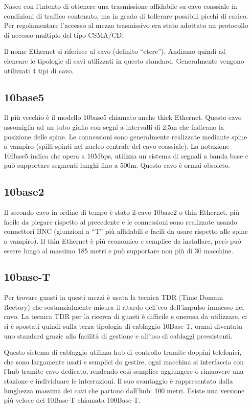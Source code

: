Nasce con l'intento di ottenere una trasmissione affidabile su cavo coassiale in condizioni di traffico contenuto, ma in grado di tollerare possibili picchi di carico. Per regolamentare l'accesso al mezzo trasmissivo era stato adottato un protocollo di accesso multiplo del tipo CSMA/CD.

Il nome Ethernet si riferisce al cavo (definito “etere”). Andiamo quindi ad elencare le tipologie di cavi utilizzati in questo standard.
Generalmente vengono utilizzati 4 tipi di cavo.
\subsection{10base5}
Il più vecchio è il modello 10base5 chiamato anche thick Ethernet. Questo cavo assomiglia ad un tubo giallo con segni a intervalli di 2,5m che indicano la posizione delle spine.
Le connessioni sono generalmente realizzate mediante spine a vampiro (spilli spinti nel nucleo centrale del cavo coassiale). 
La notazione 10Base5 indica che opera a 10Mbps, utilizza un sistema di segnali a banda base e può supportare segmenti lunghi fino a 500m. Questo cavo è ormai obsoleto.
\subsection{10base2}
Il secondo cavo in ordine di tempo è stato il cavo 10base2 o thin Ethernet, più facile da piegare rispetto al precedente e le connessioni sono realizzate usando connettori BNC (giunzioni a “T” più affidabili e facili da usare rispetto alle spine a vampiro). Il thin Ethernet è più economico e semplice da installare, però può essere lungo al massimo 185 metri e può supportare non più di 30 macchine.
\subsection{10base-T}
Per trovare guasti in questi mezzi è usata la tecnica TDR (Time Domain Rectory) che sostanzialmente misura il ritardo dell'eco dell'impulso immesso nel cavo.
La tecnica TDR per la ricerca di guasti è difficile e onerosa da utilizzare, ci si è spostati quindi sulla terza tipologia di cablaggio 10Base-T, ormai diventata uno standard grazie alla facilità di gestione e all'uso di cablaggi preesistenti.

Questo sistema di cablaggio utilizza hub di controllo tramite doppini telefonici, che sono largamente usati e semplici da gestire, ogni macchina si interfaccia con l'hub tramite cavo dedicato, rendendo così semplice aggiungere o rimuovere una stazione e individuare le interruzioni. Il suo svantaggio è rappresentato dalla lunghezza massima dei cavi che partono dall'hub: 100 metri. Esiste una versione più veloce del 10Base-T chiamata 100Base-T.
